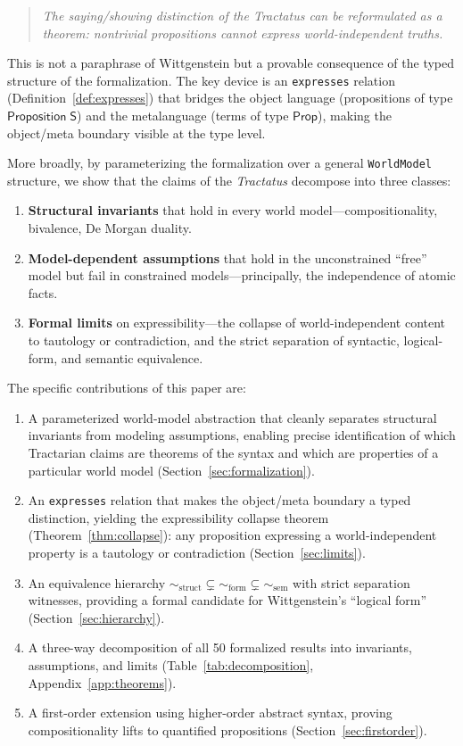 \documentclass[10pt, letterpaper]{article}
\theoremstyle{definition}
\theoremstyle{remark}
\newcommand{\Sach}{\mathsf{S}}
\newcommand{\Prop}{\mathsf{Prop}}
\newcommand{\structEq}{\sim_{\mathrm{struct}}}
\newcommand{\formEq}{\sim_{\mathrm{form}}}
\newcommand{\semEq}{\sim_{\mathrm{sem}}}
\begin{document}
\begin{quote}
\emph{The saying/showing distinction of the \emph{Tractatus} can
be reformulated as a theorem: nontrivial propositions cannot
express world-independent truths.}
\end{quote}

\noindent
This is not a paraphrase of Wittgenstein but a provable
consequence of the typed structure of the formalization.
The key device is an \texttt{expresses} relation (Definition~\ref{def:expresses})
that bridges the object language (propositions of type
$\mathsf{Proposition}\;\Sach$) and the metalanguage (terms of
type $\Prop$), making the object/meta boundary visible at the
type level.

More broadly, by parameterizing the formalization over a general
\texttt{WorldModel} structure, we show that the claims of the
\emph{Tractatus} decompose into three classes:
\begin{enumerate}[nosep]
  \item \textbf{Structural invariants} that hold in every world
    model---compositionality, bivalence, De Morgan duality.
  \item \textbf{Model-dependent assumptions} that hold in the
    unconstrained ``free'' model but fail in constrained
    models---principally, the independence of atomic facts.
  \item \textbf{Formal limits} on expressibility---the collapse
    of world-independent content to tautology or contradiction,
    and the strict separation of syntactic, logical-form, and
    semantic equivalence.
\end{enumerate}

\noindent
The specific contributions of this paper are:
\begin{enumerate}[nosep, label=(\arabic*)]
  \item A parameterized world-model abstraction that cleanly
    separates structural invariants from modeling assumptions,
    enabling precise identification of which Tractarian claims
    are theorems of the syntax and which are properties of a
    particular world model (Section~\ref{sec:formalization}).
  \item An \texttt{expresses} relation that makes the object/meta
    boundary a typed distinction, yielding the expressibility
    collapse theorem (Theorem~\ref{thm:collapse}): any proposition
    expressing a world-independent property is a tautology or
    contradiction (Section~\ref{sec:limits}).
  \item An equivalence hierarchy $\structEq \subsetneq \formEq
    \subsetneq \semEq$ with strict separation witnesses, providing
    a formal candidate for Wittgenstein's ``logical form''
    (Section~\ref{sec:hierarchy}).
  \item A three-way decomposition of all 50 formalized results
    into invariants, assumptions, and limits
    (Table~\ref{tab:decomposition}, Appendix~\ref{app:theorems}).
  \item A first-order extension using higher-order abstract syntax,
    proving compositionality lifts to quantified propositions
    (Section~\ref{sec:firstorder}).
\end{enumerate}
\end{document}
